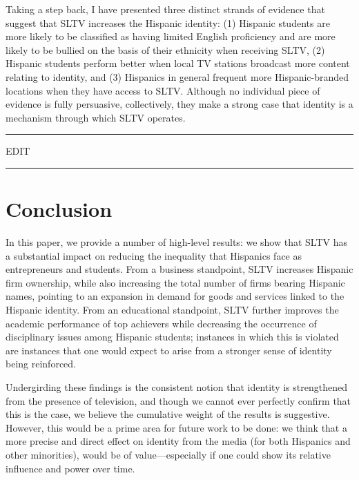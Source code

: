 \documentclass[11pt]{article}
\begin{document}
Taking a step back, I have presented three distinct strands of evidence that suggest that SLTV increases the Hispanic identity: (1) Hispanic students are more likely to be classified as having limited English proficiency and are more likely to be bullied on the basis of their ethnicity when receiving SLTV, (2) Hispanic students perform better when local TV stations broadcast more content relating to identity, and (3) Hispanics in general frequent more Hispanic-branded locations when they have access to SLTV. Although no individual piece of evidence is fully persuasive, collectively, they make a strong case that identity is a mechanism through which SLTV operates.




\vspace{5em}
\hrule
\vspace{.5em}
EDIT \\
\hrule
\vspace{.5em}

\section{Conclusion} \label{s:conclusion}




In this paper, we provide a number of high-level results: we show that SLTV has a substantial impact on reducing the inequality that Hispanics face as entrepreneurs and students. From a business standpoint, SLTV increases Hispanic firm ownership, while also increasing the total number of firms bearing Hispanic names, pointing to an expansion in demand for goods and services linked to the Hispanic identity. From an educational standpoint, SLTV further improves the academic performance of top achievers while decreasing the occurrence of disciplinary issues among Hispanic students; instances in which this is violated are instances that one would expect to arise from a stronger sense of identity being reinforced. 

Undergirding these findings is the consistent notion that identity is strengthened from the presence of television, and though we cannot ever perfectly confirm that this is the case, we believe the cumulative weight of the results is suggestive. However, this would be a prime area for future work to be done: we think that a more precise and direct effect on identity from the media (for both Hispanics and other minorities), would be of value---especially if one could show its relative influence and power over time.
\end{document}
